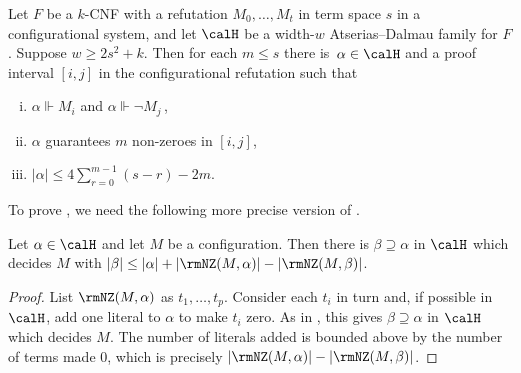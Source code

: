 \documentclass{toc}
\begin{document}
\begin{lemma}\label{lem:main-prime}
Let $F$ be a $k$-CNF with a refutation $M_0,\ldots,M_t$ in term space $s$ 
in a configurational system,
and let $\calH$ be a width-$w$ Atserias--Dalmau family for $F$.
Suppose $w \ge 2s^2+k$.
Then for each $m \le s$ there is~$\alpha \in \calH$ 
and a proof interval $[i,j]$ in the configurational refutation such that
\begin{enumerate}[(i)]
\item 
$\alpha \Vdash M_{i}$ and  $\alpha \Vdash \neg M_{j}$\,,
\item 
$\alpha$ guarantees $m$ non-zeroes in $[i,j]$,
\item 
$|\alpha| \le 4 \sum_{r=0}^{m-1} (s-r) -2m$.
\end{enumerate}
\end{lemma}

To prove ,  
we need the following more precise version of .

\begin{lemma} \label{lem:extend_NZ}
Let $\alpha \in \calH$ and let $M$ be a configuration. 
Then there is $\beta \supseteq \alpha$ in $\calH$ 
which decides $M$ with
$|\beta| \le |\alpha|+|\rmNZ(M,\alpha)|-|\rmNZ(M, \beta)|$.
\end{lemma}

\begin{proof}
List $\rmNZ(M, \alpha)$ as $t_1, \dots, t_p$.
Consider each $t_i$ in turn and, if possible in $\calH$, add one literal to $\alpha$ to make $t_i$ zero.
As in ,
this gives $\beta \supseteq \alpha$ in $\calH$ which decides $M$.
The number of literals added is bounded above by the number
of terms made $0$, which is precisely $|\rmNZ(M,\alpha)|-|\rmNZ(M, \beta)|$. 
\end{proof}
\end{document}
